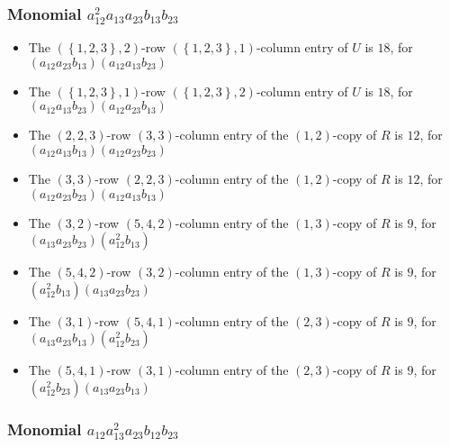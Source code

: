 \documentclass{article}
\begin{document}
\subsubsection{Monomial $ a_{12}^{2} a_{13} a_{23} b_{13} b_{23} $}

\begin{itemize}
\item The $ \left(\left\{1, 2, 3\right\}, 2\right) $-row $ \left(\left\{1, 2, 3\right\}, 1\right) $-column entry of $U$ is $ 18 $, for $( a_{12} a_{23} b_{13} )( a_{12} a_{13} b_{23} )$ 
\item The $ \left(\left\{1, 2, 3\right\}, 1\right) $-row $ \left(\left\{1, 2, 3\right\}, 2\right) $-column entry of $U$ is $ 18 $, for $( a_{12} a_{13} b_{23} )( a_{12} a_{23} b_{13} )$ 
\item The $(2, 2, 3)$-row $(3, 3)$-column entry of the $ \left(1, 2\right) $-copy of $R$ is $ 12 $, for $( a_{12} a_{13} b_{13} )( a_{12} a_{23} b_{23} )$ 
\item The $(3, 3)$-row $(2, 2, 3)$-column entry of the $ \left(1, 2\right) $-copy of $R$ is $ 12 $, for $( a_{12} a_{23} b_{23} )( a_{12} a_{13} b_{13} )$ 
\item The $(3, 2)$-row $(5, 4, 2)$-column entry of the $ \left(1, 3\right) $-copy of $R$ is $ 9 $, for $( a_{13} a_{23} b_{23} )( a_{12}^{2} b_{13} )$ 
\item The $(5, 4, 2)$-row $(3, 2)$-column entry of the $ \left(1, 3\right) $-copy of $R$ is $ 9 $, for $( a_{12}^{2} b_{13} )( a_{13} a_{23} b_{23} )$ 
\item The $(3, 1)$-row $(5, 4, 1)$-column entry of the $ \left(2, 3\right) $-copy of $R$ is $ 9 $, for $( a_{13} a_{23} b_{13} )( a_{12}^{2} b_{23} )$ 
\item The $(5, 4, 1)$-row $(3, 1)$-column entry of the $ \left(2, 3\right) $-copy of $R$ is $ 9 $, for $( a_{12}^{2} b_{23} )( a_{13} a_{23} b_{13} )$ 
\end{itemize}
\subsubsection{Monomial $ a_{12} a_{13}^{2} a_{23} b_{12} b_{23} $}
\end{document}

